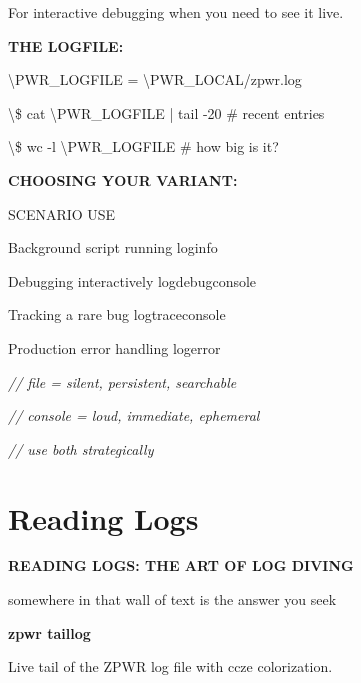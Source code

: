 \documentclass[11pt,a4paper,twoside]{book}
\begin{document}
For interactive debugging when you need to see it live.


\vspace{12pt}
{\bfseries\color{neonyellow} THE LOGFILE:}\vspace{4pt}

\begin{codebox}
\textbackslash{}PWR\_LOGFILE = \textbackslash{}PWR\_LOCAL/zpwr.log\\
\end{codebox}

\textbackslash{}\$ cat \textbackslash{}PWR\_LOGFILE | tail -20   \# recent entries

\textbackslash{}\$ wc -l \textbackslash{}PWR\_LOGFILE           \# how big is it?


\vspace{12pt}
{\bfseries\color{neonyellow} CHOOSING YOUR VARIANT:}\vspace{4pt}

SCENARIO                          USE

Background script running          loginfo

Debugging interactively             logdebugconsole

Tracking a rare bug                 logtraceconsole

Production error handling           logerror

{\small\itshape\color{dimtext} // file = silent, persistent, searchable}

{\small\itshape\color{dimtext} // console = loud, immediate, ephemeral}

{\small\itshape\color{dimtext} // use both strategically}


\vspace{16pt}

\section{Reading Logs}


\vspace{10pt}
{\large\bfseries\color{neoncyan} READING LOGS: THE ART OF LOG DIVING}\vspace{6pt}

somewhere in that wall of text is the answer you seek


\vspace{12pt}
{\bfseries\color{neonyellow} zpwr taillog}\vspace{4pt}

Live tail of the ZPWR log file with ccze colorization.
\end{document}

